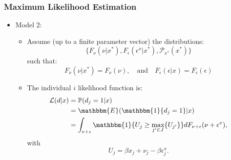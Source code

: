 \begin{frame}
\frametitle{Maximum Likelihood Estimation}

\begin{itemize}
	\item Model 2:
	\begin{itemize}
		\item Assume (up to a finite parameter vector) the distributions: 
		\begin{equation*}
		\{F_{\nu}(\nu|x^{*}), F_{\epsilon}(\epsilon^{x}|x^{*}), \mathcal{P}_{x^{*}}(x^{*})\}
		\end{equation*}
		such that:
		\begin{equation*}
		F_{\nu}(\nu|x^{*})=F_{\nu}(\nu),\quad\text{and}\quad F_{\epsilon}(\epsilon|x)=F_{\epsilon}(\epsilon)
		\end{equation*}
		\item The individual $i$ likelihood function is:
		\begin{equation*}
		\begin{split}
		\mathcal{L}(d|x)&=\mathbb{P}(d_{j}=1|x)\\
		&=\mathbbm{E}(\mathbbm{1}\{d_{j}=1\}|x)\\
		&=\int_{\nu+\epsilon}\mathbbm{1}\{U_{j}\geq\max_{j'\in J}\{U_{j'}\}\}dF_{\nu+\epsilon}(\nu+\epsilon^{x}),\\
		\end{split}
		\end{equation*}
		with
		\begin{equation*}
		U_{j}=\beta x_{j}+\nu_{j}-\beta\epsilon^{x}_{j}.
		\end{equation*}
	\end{itemize}
\end{itemize}
\end{frame}		

